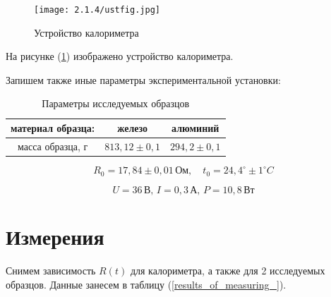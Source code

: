 \documentclass[a4paper,12pt]{article} %
\begin{document}
\begin{figure}[h!]
	\begin{center}
		\texttt{[image: 2.1.4/ustfig.jpg]}
		\caption{Устройство калориметра}
		\label{fig:Ris_of_facility}
	\end{center}
\end{figure}	

На рисунке (\ref{fig:Ris_of_facility}) изображено устройство калориметра.

Запишем также иные параметры экспериментальной установки:

\begin{table}[h!]
	\centering
	\begin{tabular}{|c|c|c|}
		\hline
		материал образца: & железо & алюминий        \\ \hline
		масса образца, г  & $813,12\pm 0,1$ & $294,2 \pm 0,1$ \\ \hline
	\end{tabular}
	\caption{Параметры исследуемых образцов}
	\label{tab:param_of_facility}
\end{table}

$$R_{0} = 17,84 \pm 0,01 \, \text{Ом}, \quad t_{0} = 24,4^{\circ} \pm 1 ^{\circ} C$$

$$ U = 36 \, \text{В}, \, I = 0,3 \, \text{А}, \, P = 10,8 \, \text{Вт} $$

\section{Измерения}

Снимем зависимость $R(t)$ для калориметра, а также для 2 исследуемых образцов. Данные занесем в таблицу (\ref{results_of_measuring_}).
	
\end{document}
